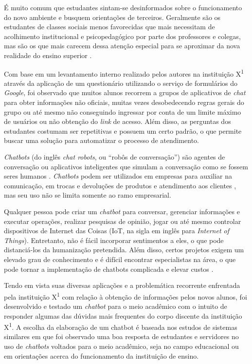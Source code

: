 \documentclass[12pt]{article}
\begin{document}
É muito comum que estudantes sintam-se desinformados sobre o funcionamento do novo ambiente e busquem orientações de terceiros. Geralmente são os estudantes de classes sociais menos favorecidas que mais necessitam de acolhimento institucional e psicopedagógico por parte dos professores e colegas, mas são os que mais carecem dessa atenção especial para se aproximar da nova realidade do ensino superior \cite{torres:21}.

Com base em um levantamento interno realizado pelos autores na instituição X\textsuperscript{1} através da aplicação de um questionário utilizando o serviço de formulários do {\itshape Google}, foi observado que muitos alunos recorrem a grupos de aplicativos de {\itshape chat} para obter informações não oficiais, muitas vezes desobedecendo regras gerais do grupo ou até mesmo não conseguindo ingressar por conta de um limite máximo de usuários ou não obtenção do {\itshape link} de acesso. Além disso, as perguntas dos estudantes costumam ser repetitivas e possuem um certo padrão, o que permite buscar uma solução para automatizar o processo de atendimento.

{\itshape Chatbots} (do inglês {\itshape chat robots}, ou “robôs de conversação”) são agentes de conversação ou aplicativos inteligentes que simulam a conversação como se fossem seres humanos \cite{lucchesi:18}. {\itshape Chatbots} podem ser utilizados em empresas para auxiliar na comunicação, em trocas e devoluções de produtos e atendimento aos clientes \cite{correia:19} \cite{valente:20}, mas seu uso não se limita somente ao ramo empresarial.

Qualquer pessoa pode criar um {\itshape chatbot} para conversar, gerenciar informações e executar operações, realizar pesquisas de opinião, jogar ou até mesmo controlar dispositivos de Internet das Coisas (IoT, na sigla em inglês para {\itshape Internet of Things}). Entretanto, não é fácil incorporar sentimentos a eles, o que pode distanciá-los da humanização pretendida. Além disso, certos projetos exigem um elevado grau de conhecimento e é difícil encontrar especialistas na área, o que pode tornar a implementação de chatbots complicada e elevar custos \cite{guerreiro:19}.

Tendo em vista suas diversas aplicações e a problemática recorrente enfrentada pela instituição X\textsuperscript{1} com relação à obtenção de informações pelos novos alunos, foi desenvolvido e testado um {\itshape chatbot} para o meio acadêmico com o intuito de responder algumas das dúvidas mais frequentes do corpo discente da instituição X\textsuperscript{1}. A escolha da elaboração de um chatbot é baseada nos estudos de sistemas similares \cite{araujo:20} \cite{bulhoes:20} \cite{lucchesi:18} \cite{maciel:19} \cite{silva:21} em que foi observado uma boa resposta de estudantes e servidores no uso de {\itshape chatbots} voltados para o meio acadêmico, seja no campo educacional ou em orientações acerca do funcionamento da instituição de ensino.
\end{document}
